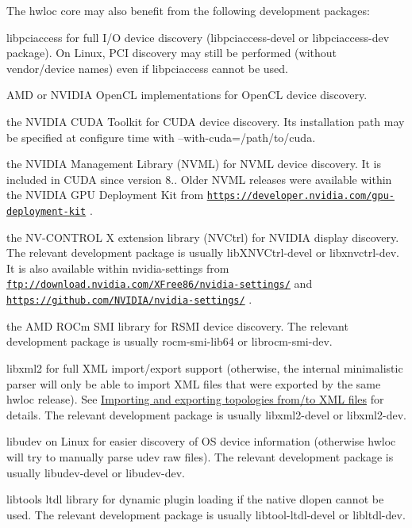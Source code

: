 The hwloc core may also benefit from the following development packages\+: 
\begin{DoxyItemize}
\item libpciaccess for full I/O device discovery ({\ttfamily libpciaccess-\/devel} or {\ttfamily libpciaccess-\/dev} package). On Linux, P\+CI discovery may still be performed (without vendor/device names) even if libpciaccess cannot be used. 


\item A\+MD or N\+V\+I\+D\+IA Open\+CL implementations for Open\+CL device discovery.  
\item the N\+V\+I\+D\+IA C\+U\+DA Toolkit for C\+U\+DA device discovery. It\textquotesingle{}s installation path may be specified at configure time with {\ttfamily --with-\/cuda=/path/to/cuda}.  
\item the N\+V\+I\+D\+IA Management Library (N\+V\+ML) for N\+V\+ML device discovery. It is included in C\+U\+DA since version 8.. Older N\+V\+ML releases were available within the N\+V\+I\+D\+IA G\+PU Deployment Kit from \href{https://developer.nvidia.com/gpu-deployment-kit}{\tt https\+://developer.\+nvidia.\+com/gpu-\/deployment-\/kit} .  
\item the N\+V-\/\+C\+O\+N\+T\+R\+OL X extension library (N\+V\+Ctrl) for N\+V\+I\+D\+IA display discovery. The relevant development package is usually {\ttfamily lib\+X\+N\+V\+Ctrl-\/devel} or {\ttfamily libxnvctrl-\/dev}. It is also available within nvidia-\/settings from \href{ftp://download.nvidia.com/XFree86/nvidia-settings/}{\tt ftp\+://download.\+nvidia.\+com/\+X\+Free86/nvidia-\/settings/} and \href{https://github.com/NVIDIA/nvidia-settings/}{\tt https\+://github.\+com/\+N\+V\+I\+D\+I\+A/nvidia-\/settings/} .  
\item the A\+MD R\+O\+Cm S\+MI library for R\+S\+MI device discovery. The relevant development package is usually {\ttfamily rocm-\/smi-\/lib64} or {\ttfamily librocm-\/smi-\/dev}.  
\item libxml2 for full X\+ML import/export support (otherwise, the internal minimalistic parser will only be able to import X\+ML files that were exported by the same hwloc release). See \hyperlink{a00388}{Importing and exporting topologies from/to X\+ML files} for details. The relevant development package is usually {\ttfamily libxml2-\/devel} or {\ttfamily libxml2-\/dev}.  
\item libudev on Linux for easier discovery of OS device information (otherwise hwloc will try to manually parse udev raw files). The relevant development package is usually {\ttfamily libudev-\/devel} or {\ttfamily libudev-\/dev}.  
\item libtool\textquotesingle{}s ltdl library for dynamic plugin loading if the native dlopen cannot be used. The relevant development package is usually {\ttfamily libtool-\/ltdl-\/devel} or {\ttfamily libltdl-\/dev}.  
\end{DoxyItemize}

